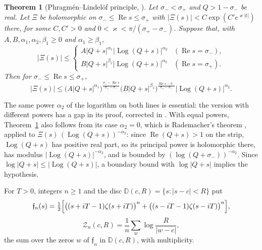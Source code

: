 \documentclass[11pt,a4paper]{article}
\makeatletter
\numberwithin{equation}{section}
\DeclareRobustCommand{\CGref}[1]{\ref{#1}}
\DeclareRobustCommand{\CGcite}[2][]{\if\relax\detokenize{#1}\relax\cite{#2}\else\cite[#1]{#2}\fi}
\let\CG@origref\ref
\newcommand{\CG@gettip}[1]{\@ifundefined{CGTip@#1}{#1}{\csname CGTip@#1\endcsname}}
\newcommand{\CG@getbib}[1]{\@ifundefined{CGBib@#1}{#1}{\csname CGBib@#1\endcsname}}
\DeclareRobustCommand{\CGref}[1]{\pdftooltip{\CG@origref{#1}}{\CG@gettip{#1}}}
\DeclareRobustCommand{\CGcite}[2][]{\pdftooltip{\if\relax\detokenize{#1}\relax\cite{#2}\else\cite[#1]{#2}\fi}{\CG@getbib{#2}}}
\newtheorem{theorem}{Theorem}[section]
\theoremstyle{definition}
\theoremstyle{remark}
\makeatother
\begin{document}
\begin{theorem}[{Phragm\'en--Lindel\"of principle, \CGcite[Cor.~3]{Fiori2025}}]\label{thm:known_PL}
Let $\sigma_-<\sigma_+$ and $Q>1-\sigma_-$ be real. Let $\Xi$ be holomorphic on $\sigma_-\le\operatorname{Re}s\le\sigma_+$ with $|\Xi(s)|<C\exp(C'e^{\varkappa|t|})$ there, for some $C,C'>0$ and $0<\varkappa<\pi/(\sigma_+-\sigma_-)$. Suppose that, with $A,B,\alpha_1,\alpha_2,\beta_1\ge0$ and $\alpha_1\ge\beta_1$,
\[
|\Xi(s)|\le\begin{cases}A|Q+s|^{\alpha_1}|\operatorname{Log}(Q+s)|^{\alpha_2}&(\operatorname{Re}s=\sigma_-),\\ B|Q+s|^{\beta_1}|\operatorname{Log}(Q+s)|^{\alpha_2}&(\operatorname{Re}s=\sigma_+).\end{cases}
\]
Then for $\sigma_-\le\operatorname{Re}s\le\sigma_+$,
\[
|\Xi(s)|\le\bigl(A|Q+s|^{\alpha_1}\bigr)^{\frac{\sigma_+-\operatorname{Re}s}{\sigma_+-\sigma_-}}\bigl(B|Q+s|^{\beta_1}\bigr)^{\frac{\operatorname{Re}s-\sigma_-}{\sigma_+-\sigma_-}}|\operatorname{Log}(Q+s)|^{\alpha_2}.
\]
\end{theorem}
The same power $\alpha_2$ of the logarithm on both lines is essential: the version with different powers \CGcite[Lemma~3]{Trudgian2014} has a gap in its proof, corrected in \CGcite{Fiori2025}. With equal powers, Theorem~\CGref{thm:known_PL} also follows from its case $\alpha_2=0$, which is Rademacher's theorem \CGcite{Rademacher1959}, applied to $\Xi(s)\,(\operatorname{Log}(Q+s))^{-\alpha_2}$: since $\operatorname{Re}(Q+s)>1$ on the strip, $\operatorname{Log}(Q+s)$ has positive real part, so its principal power is holomorphic there, has modulus $|\operatorname{Log}(Q+s)|^{-\alpha_2}$, and is bounded by $(\log(Q+\sigma_-))^{-\alpha_2}$. Since $\log|Q+s|\le|\operatorname{Log}(Q+s)|$, a boundary bound with $\log|Q+s|$ implies the hypothesis.

For $T>0$, integers $n\ge1$ and the disc $\mathbb D(c,R)=\{s:|s-c|<R\}$ put
\begin{equation}
\mathfrak f_n(s)=\tfrac12\Bigl[\bigl((s+iT-1)\zeta(s+iT)\bigr)^n+\bigl((s-iT-1)\zeta(s-iT)\bigr)^n\Bigr],
\label{eq:backlund_f}
\end{equation}
\begin{equation}
\mathcal Z_n(c,R)=\frac1n\sum_{w}\log\frac R{|w-c|},
\label{eq:backlund_Z}
\end{equation}
the sum over the zeros $w$ of $\mathfrak f_n$ in $\mathbb D(c,R)$, with multiplicity.
\end{document}
